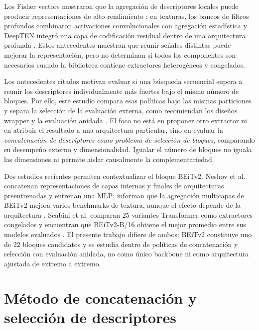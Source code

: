 \documentclass[a4paper,fleqn]{cas-sc}
\begin{document}
Los Fisher vectors mostraron que la agregación de descriptores locales puede producir representaciones de alto rendimiento \citep{sanchez2013image}; en texturas, los bancos de filtros profundos combinaron activaciones convolucionales con agregación estadística \citep{cimpoi2016fisher} y DeepTEN integró una capa de codificación residual dentro de una arquitectura profunda \citep{zhang2017deepten}. Estos antecedentes muestran que reunir señales distintas puede mejorar la representación, pero no determinan si todos los componentes son necesarios cuando la biblioteca contiene extractores heterogéneos y congelados.

Los antecedentes citados motivan evaluar si una búsqueda secuencial supera a reunir los descriptores individualmente más fuertes bajo el mismo número de bloques. Por ello, este estudio compara esas políticas bajo las mismas particiones y separa la selección de la evaluación externa, como recomiendan los diseños wrapper y la evaluación anidada \citep{kohavi1997wrappers,guyon2003feature}. El foco no está en proponer otro extractor ni en atribuir el resultado a una arquitectura particular, sino en evaluar la \emph{concatenación de descriptores como problema de selección de bloques}, comparando su desempeño externo y dimensionalidad. Igualar el número de bloques no iguala las dimensiones ni permite aislar causalmente la complementariedad.

Dos estudios recientes permiten contextualizar el bloque BEiTv2. Neshov et al. concatenan representaciones de capas internas y finales de arquitecturas preentrenadas y entrenan una MLP; informan que la agregación multicapas de BEiTv2 mejora varios benchmarks de textura, aunque el efecto depende de la arquitectura \citep{neshov2025aggregation}. Scabini et al. comparan 25 variantes Transformer como extractores congelados y encuentran que BEiTv2-B/16 obtiene el mejor promedio entre sus modelos evaluados \citep{scabini2025survey}. El presente trabajo difiere de ambos: BEiTv2 constituye uno de 22 bloques candidatos y se estudia dentro de políticas de concatenación y selección con evaluación anidada, no como único backbone ni como arquitectura ajustada de extremo a extremo.

\section{Método de concatenación y selección de descriptores}\label{sec:metodo}
\end{document}
